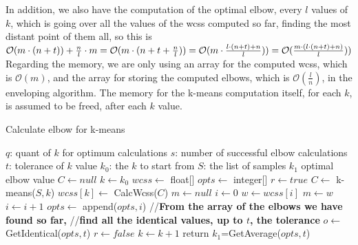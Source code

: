 \documentclass[12pt]{article}
\begin{document}
In addition, we also have the computation of the optimal elbow, every $l$ values of $k$, which is going over all the values of the wcss computed so far, finding the most distant point of them all, so this is $\mathcal{O}(m \cdot (n+t)) + \frac{n}{l} \cdot m=
\newline
\mathcal{O}(m \cdot (n+t+\frac{n}{l}))=\mathcal{O}(m \cdot \frac{l \cdot (n+t)+n}{l}))=\mathcal{O}(\frac{m \cdot (l \cdot (n+t)+n)}{l}))$ \newline
Regarding the memory, we are only using an array for the computed wcss, which is $\mathcal{O}(m)$, and the array for storing the computed elbows, which is $\mathcal{O}(\frac{l}{n})$, in the enveloping algorithm. The memory for the k-means computation itself, for each $k$, is assumed to be freed, after each $k$ value. \newline

\begin{algorithm}
\caption{Calculate elbow for k-means}
\begin{algorithmic} 
\REQUIRE
\STATE $q$: quant of $k$ for optimum calculations
\STATE $s$: number of successful elbow calculations
\STATE $t$: tolerance of $k$ value
\STATE $k_0$: the $k$ to start from
\STATE $S$: the list of samples
\ENSURE $k_1$ optimal elbow value
\STATE $C \leftarrow null$
\STATE $k \leftarrow k_0$
\newline
\STATE $wcss \leftarrow $ float[]
\STATE $opts \leftarrow $ integer[]
\STATE $r \leftarrow true$
\newline
{}
\STATE $C \leftarrow $ k-means($S, k$)
\newline
\STATE $wcss[k] \leftarrow $ CalcWcss($C$)
\newline
{}
\STATE $m \leftarrow null$
\STATE $i \leftarrow 0$
\STATE $w \leftarrow wcss[i]$
\newline
{}
\STATE $m \leftarrow w$
\ENDIF
\newline
\STATE $i \leftarrow i+1$
\ENDWHILE
\STATE $opts \leftarrow $ append($opts,i$)
\ENDIF \newline
//\textbf{From the array of the elbows we have found so far,}\newline
//\textbf{find all the identical values, up to $t$, the tolerance}
\STATE $o \leftarrow $ GetIdentical($opts,t$)
\STATE $r \leftarrow false$
\ELSE
\STATE $k \leftarrow k+1$
\ENDIF
\newline
\ENDWHILE
\STATE return $k_1$=GetAverage($opts,t$)
\end{algorithmic}
\end{algorithm}
\end{document}

